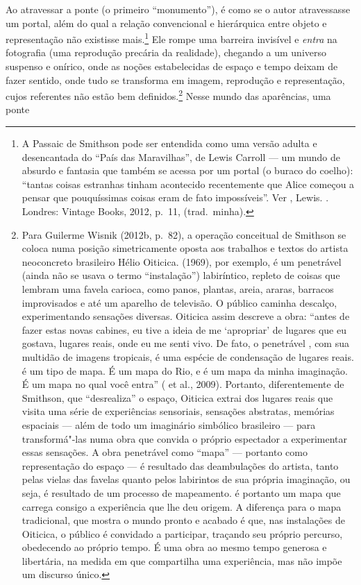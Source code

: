 Ao atravessar a ponte (o primeiro ``monumento''), é como se o autor
atravessasse um portal, além do qual a relação convencional e
hierárquica entre objeto e representação não existisse mais.\footnote{A
  Passaic de Smithson pode ser entendida como uma versão adulta e
  desencantada do ``País das Maravilhas'', de Lewis Carroll --- um mundo
  de absurdo e fantasia que também se acessa por um portal (o buraco do
  coelho): ``tantas coisas estranhas tinham acontecido recentemente que
  Alice começou a pensar que pouquíssimas coisas eram de fato
  impossíveis''. Ver , Lewis. {}. Londres: Vintage Books, 2012, p.~11, (trad.~minha).} Ele
rompe uma barreira invisível e \emph{entra} na fotografia (uma
reprodução precária da realidade), chegando a um universo suspenso e
onírico, onde as noções estabelecidas de espaço e tempo deixam de fazer
sentido, onde tudo se transforma em imagem, reprodução e representação,
cujos referentes não estão bem definidos.\footnote{Para Guilerme Wisnik (2012b, p.~82), a
  operação conceitual de Smithson se coloca numa posição simetricamente
  oposta aos trabalhos e textos do artista neoconcreto brasileiro Hélio
  Oiticica. {} (1969), por exemplo, é um penetrável
  (ainda não se usava o termo ``instalação'') labiríntico, repleto de
  coisas que lembram uma favela carioca, como panos, plantas, areia,
  araras, barracos improvisados e até um aparelho de televisão. O
  público caminha descalço, experimentando sensações diversas. Oiticica
  assim descreve a obra: ``antes de fazer estas novas cabines, eu tive a
  ideia de me `apropriar' de lugares que eu gostava, lugares reais, onde
  eu me senti vivo. De fato, o penetrável {}, com sua multidão
  de imagens tropicais, é uma espécie de condensação de lugares
  reais. {} é um tipo de mapa. É um mapa do Rio, e é um mapa da
  minha imaginação. É um mapa no qual você entra'' ( et
  al., 2009). Portanto, diferentemente de Smithson, que ``desrealiza'' o
  espaço, Oiticica extrai dos lugares reais que visita uma série de
  experiências sensoriais, sensações abstratas, memórias espaciais ---
  além de todo um imaginário simbólico brasileiro --- para transformá"-las
  numa obra que convida o próprio espectador a experimentar essas
  sensações. A obra penetrável como ``mapa'' --- portanto como
  representação do espaço --- é resultado das deambulações do artista,
  tanto pelas vielas das favelas quanto pelos labirintos de sua própria
  imaginação, ou seja, é resultado de um processo de mapeamento.
  {} é portanto um mapa que carrega consigo a experiência
  que lhe deu origem. A diferença para o mapa tradicional, que mostra o
  mundo pronto e acabado é que, nas instalações de Oiticica, o público é
  convidado a participar, traçando seu próprio percurso, obedecendo ao
  próprio tempo. É uma obra ao mesmo tempo generosa e libertária, na
  medida em que compartilha uma experiência, mas não impõe um discurso
  único.} Nesse mundo das aparências, uma ponte
